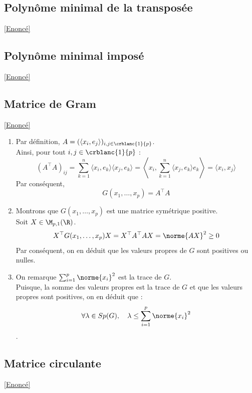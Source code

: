 \documentclass[8pt]{book}
\begin{document}
	\subsection{Polynôme minimal de la transposée}
	\label{Polynôme minmal de la transposée corrigé}
	\textcolor{blue}{\hyperref[Polynôme minimal de la transposée]{[Enoncé]}}\\
	
	\subsection{Polynôme minimal imposé}
	\label{Polynôme minimal imposé corrigé}
	\textcolor{blue}{\hyperref[Polynôme minimal imposé]{[Enoncé]}}\\
	
	\subsection{Matrice de Gram}
	\label{Matrice de Gram corrigé}
	\textcolor{blue}{\hyperref[Matrice de Gram]{[Enoncé]}}\\
	\begin{enumerate}[leftmargin=*]
		\item Par définition, $A=(\langle x_i,e_j\rangle)_{i,j\in\crblanc{1}{p}}$.\\
		Ainsi, pour tout $i,j\in\crblanc{1}{p}$ : \[(A^\top A)_{ij}=\sum_{k=1}^{n}\langle x_i,e_k\rangle \langle x_j,e_k\rangle=\left\langle x_i, \sum_{k=1}^{n}\langle x_j, e_k\rangle e_k\right\rangle=\langle x_i,x_j\rangle\]
		Par conséquent, \[G(x_1,\dots,x_p)=A^\top A\]
		\item Montrons que $G(x_1,\dots,x_p)$ est une matrice symétrique positive.\\
		Soit $X\in\M_{p,1}(\R)$.
		\[X^\top G(x_1,\dots,x_p)X=X^\top A^\top AX=\norme{AX}^2\geq 0\]
		Par conséquent, on en déduit que les valeurs propres de $G$ sont positives ou nulles.
		\item On remarque $\sum_{i=1}^{p}\norme{x_i}^2$ est la trace de $G$.\\
		Puisque, la somme des valeurs propres est la trace de $G$ et que les valeurs propres sont positives, on en déduit que :
		\[\forall \lambda\in Sp(G),\quad \lambda\leq \sum_{i=1}^{p}\norme{x_i}^2\].
	\end{enumerate}
	\subsection{Matrice circulante}
	\label{Matrice circulante corrigé}
	\textcolor{blue}{\hyperref[Matrice circulante]{[Enoncé]}}\\
	
\end{document}

